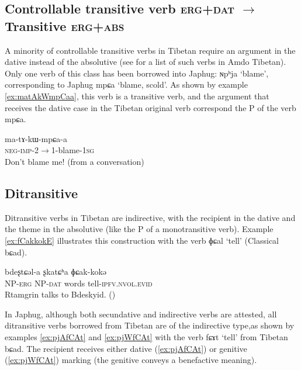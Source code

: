 \documentclass[oldfontcommands,oneside,a4paper,11pt]{article}
\newcommand{\ipa}[1]{{\phon \mbox{#1}}} %
\begin{document}
\subsection{Controllable transitive verb \textsc{erg+dat}  $\rightarrow$ Transitive \textsc{erg+abs} }
A minority of controllable transitive verbs in Tibetan require an argument in the dative instead of the absolutive (see \citealt[111]{haller04themchen} for a list of such verbs in Amdo Tibetan). Only one verb of this class has been borrowed into Japhug: \ipa{ɴpʰja} `blame', corresponding to Japhug \ipa{mpɕa} `blame, scold'. As shown by example \ref{ex:matAkWmpCaa}, this verb is a transitive verb, and the argument that receives the dative case in the Tibetan original verb correspond the P of the verb \ipa{mpɕa}.

\begin{exe}
\ex \label{ex:matAkWmpCaa}
\gll
  \ipa{ma-tɤ-kɯ-mpɕa-a} \\
  \textsc{neg-imp}-2$\rightarrow$1-blame-\textsc{1sg} \\
\glt Don't blame me! (from a conversation)
\end{exe}
  
  \subsection{Ditransitive}
Ditransitive verbs in Tibetan are indirective, with the recipient in the dative and the theme in the absolutive (like the P of a monotransitive verb). Example \ref{ex:fCakkokE} illustrates this construction with the verb \ipa{ɸɕal} `tell' (Classical \ipa{bɕad}).

\begin{exe}
\ex \label{ex:fCakkokE}
\gll \ipa{ʂtamɖʐən-ɣə}  \ipa{bdeʂtɕəl-a} \ipa{ʂkatɕʰa} \ipa{ɸɕak-kokə} \\
NP-\textsc{erg} NP-\textsc{dat} words tell-\textsc{ipfv.nvol.evid} \\
\glt Rtamgrin talks to Bdeskyid. (\citealt[87:195]{haller04themchen})
\end{exe}

In Japhug, although both secundative and indirective verbs are attested, all ditransitive verbs borrowed from Tibetan are of the indirective type,as shown by examples \ref{ex:pjAfCAt} and \ref{ex:pjWfCAt} with the verb \ipa{fɕɤt} `tell' from Tibetan \ipa{bɕad}. The recipient receives either dative (\ref{ex:pjAfCAt}) or genitive (\ref{ex:pjWfCAt}) marking (the genitive conveys a benefactive meaning).
\end{document}
